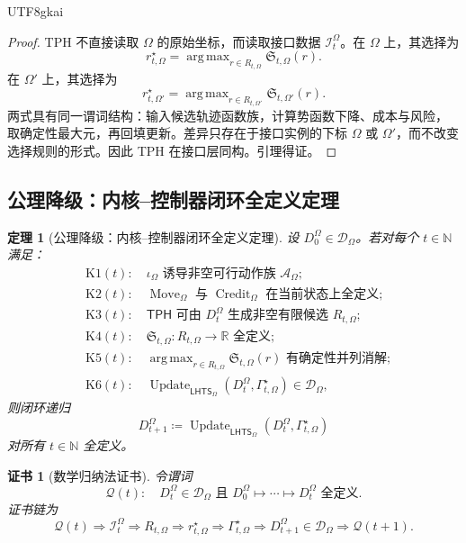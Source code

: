 \documentclass[12pt]{article}
\newtheorem{theorem}{定理}[section]
\newtheorem{Certificate}{证书}[section]
\newcommand{\NN}{\mathbb{N}}
\newcommand{\RR}{\mathbb{R}}
\newcommand{\LHTS}{\ensuremath{\mathsf{LHTS}}}
\newcommand{\TPH}{\ensuremath{\mathsf{TPH}}}
\newcommand{\DefEq}{\coloneqq}
\DeclareMathOperator{\Update}{Update}
\DeclareMathOperator{\Move}{Move}
\DeclareMathOperator{\Credit}{Credit}
\DeclareMathOperator*{\argmax}{arg\,max}
\begin{document}
\begin{CJK*}{UTF8}{gkai}
\begin{proof}
TPH 不直接读取 \(\Omega\) 的原始坐标，而读取接口数据
\(\mathcal I_t^\Omega\)。在 \(\Omega\) 上，其选择为
\[
r_{t,\Omega}^\star
=
\argmax_{r\in R_{t,\Omega}}\mathfrak S_{t,\Omega}(r).
\]
在 \(\Omega'\) 上，其选择为
\[
r_{t,\Omega'}^\star
=
\argmax_{r\in R_{t,\Omega'}}\mathfrak S_{t,\Omega'}(r).
\]
两式具有同一谓词结构：输入候选轨迹函数族，计算势函数下降、成本与风险，
取确定性最大元，再回填更新。差异只存在于接口实例的下标 \(\Omega\) 或
\(\Omega'\)，而不改变选择规则的形式。因此 TPH 在接口层同构。引理得证。
\end{proof}

\subsection{公理降级：内核--控制器闭环全定义定理}
\label{subsec:kernel-controller-well-defined}

\begin{theorem}[公理降级：内核--控制器闭环全定义定理]
设 \(D_0^\Omega\in\mathcal D_\Omega\)。若对每个 \(t\in\NN\) 满足：
\[
\begin{aligned}
&\mathrm{K1}(t):\quad
\iota_\Omega\text{ 诱导非空可行动作族 }\mathcal A_\Omega;\\
&\mathrm{K2}(t):\quad
\Move_\Omega\text{ 与 }\Credit_\Omega\text{ 在当前状态上全定义};\\
&\mathrm{K3}(t):\quad
\TPH\text{ 可由 }D_t^\Omega\text{ 生成非空有限候选 }R_{t,\Omega};\\
&\mathrm{K4}(t):\quad
\mathfrak S_{t,\Omega}:R_{t,\Omega}\to\RR\text{ 全定义};\\
&\mathrm{K5}(t):\quad
\argmax_{r\in R_{t,\Omega}}\mathfrak S_{t,\Omega}(r)
\text{ 有确定性并列消解};\\
&\mathrm{K6}(t):\quad
\Update_{\LHTS_\Omega}(D_t^\Omega,\Gamma_{t,\Omega}^\star)
\in\mathcal D_\Omega,
\end{aligned}
\]
则闭环递归
\[
D_{t+1}^\Omega
\DefEq
\Update_{\LHTS_\Omega}(D_t^\Omega,\Gamma_{t,\Omega}^\star)
\]
对所有 \(t\in\NN\) 全定义。
\end{theorem}

\begin{Certificate}[数学归纳法证书]
令谓词
\[
\mathcal Q(t):
\quad
D_t^\Omega\in\mathcal D_\Omega
\text{ 且 }
D_0^\Omega\mapsto\cdots\mapsto D_t^\Omega
\text{ 全定义}.
\]
证书链为
\[
\boxed{
\mathcal Q(t)
\Rightarrow
\mathcal I_t^\Omega
\Rightarrow
R_{t,\Omega}
\Rightarrow
r_{t,\Omega}^\star
\Rightarrow
\Gamma_{t,\Omega}^\star
\Rightarrow
D_{t+1}^\Omega\in\mathcal D_\Omega
\Rightarrow
\mathcal Q(t+1).
}
\]
\end{Certificate}


\end{CJK*}
\end{document}

